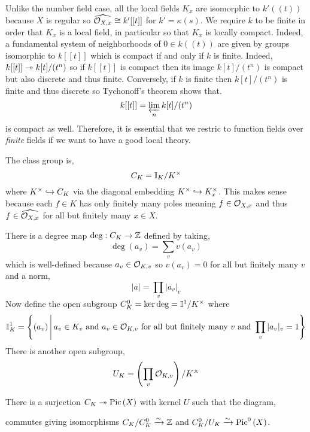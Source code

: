\documentclass[12pt]{article}
\begin{document}
\begin{rmk}
Unlike the number field case, all the local fields $K_x$ are isomorphic to $k'((t))$ because $X$ is regular so $\widehat{\mathcal{O}_{X, x}} \cong k'[[t]]$ for $k' = \kappa(s)$. We require $k$ to be finite in order that $K_x$ is a local field, in particular so that $K_x$ is locally compact. Indeed, a fundamental system of neighborhoods of $0 \in k((t))$ are given by groups isomorphic to $k[[t]]$ which is compact if and only if $k$ is finite. Indeed, $k[[t]] \twoheadrightarrow k[t]/(t^n)$ so if $k[[t]]$ is compact then its image $k[t]/(t^n)$ is compact but also discrete and thus finite. Conversely, if $k$ is finite then $k[t]/(t^n)$ is finite and thus discrete so Tychonoff's theorem shows that.
\[ k[[t]] = \varprojlim_n k[t]/(t^n) \]
is compact as well. Therefore, it is essential that we restric to function fields over \textit{finite} fields if we want to have a good local theory.
\end{rmk}

\begin{defn}
The \idele class group is,
\[ C_K = \mathbb{I}_K / K^\times \]
where $K^\times \hookrightarrow C_K$ via the diagonal embedding $K^\times \hookrightarrow K_x^\times$. This makes sense because each $f \in K$ has only finitely many poles meaning $f \in \mathcal{O}_{X, x}$ and thus $f \in \widehat{\mathcal{O}_{X, x}}$ for all but finitely many $x \in X$. 
\end{defn}

\begin{defn}
There is a degree map $\deg : C_K \to \mathbb{Z}$ defined by taking,
\[ \deg (a_v) = \sum_{v} v(a_v) \]
which is well-defined because $a_v \in \mathcal{O}_{K, v}$ so $v(a_v) = 0$ for all but finitely many $v$ and a norm,
\[ |a| = \prod_{v} |a_v|_v \]
Now define the open subgroup $C^0_K = \ker{\deg} = \mathbb{I}^1 / K^\times$ where
\[ \mathbb{I}^1_K = \left\{ (a_v) \, \middle| \, a_v \in K_v \text{ and } a_v \in \mathcal{O}_{K, v} \text{ for all but finitely many } v \text{ and } \prod_{v} |a_v|_v = 1 \right\}  \]
There is another open subgroup,
\[ U_K = \left( \prod_{v} \mathcal{O}_{K, v} \right) / K^\times \]
\end{defn}

\begin{prop}
There is a surjection $C_K \twoheadrightarrow \mathrm{Pic} \left( X \right)$ with kernel $U$ such that the diagram,
\begin{center}
\end{center}
commutes giving isomorphisms $C_K / C^0_K \xrightarrow{\sim} \mathbb{Z}$ and $C_K^0/U_K \xrightarrow{\sim} \mathrm{Pic}^0\left( X \right)$.
\end{prop}
\end{document}
